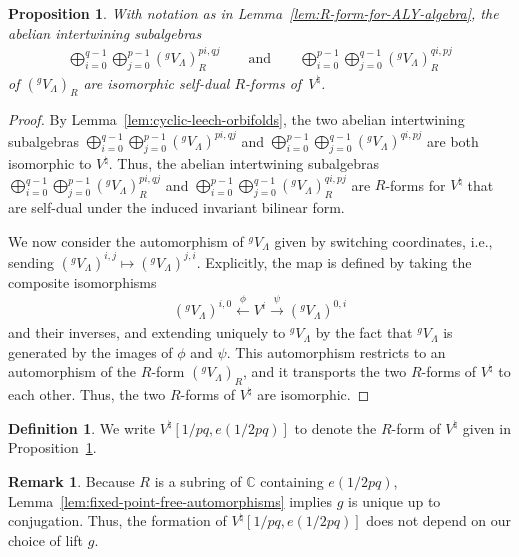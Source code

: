 \documentclass[11pt]{article}
\newcommand{\bC}{\mathbb{C}}
\newtheorem{prop}[thm]{Proposition}
\theoremstyle{definition}
\newtheorem{defn}[thm]{Definition}
\newtheorem{rem}[thm]{Remark}
\begin{document}
\begin{prop} \label{prop:R-forms-of-moonshine}
With notation as in Lemma~{\rm \ref{lem:R-form-for-ALY-algebra}}, the abelian intertwining subalgebras
\begin{gather*} \bigoplus_{i=0}^{q-1} \bigoplus_{j=0}^{p-1} ({}^gV_\Lambda)_R^{pi,qj} \qquad \text{and} \qquad \bigoplus_{i=0}^{p-1} \bigoplus_{j=0}^{q-1} ({}^gV_\Lambda)_R^{qi,pj}\end{gather*} of $({}^gV_\Lambda)_R$ are isomorphic self-dual $R$-forms of~$V^\natural$.
\end{prop}
\begin{proof}By Lemma~\ref{lem:cyclic-leech-orbifolds}, the two abelian intertwining subalgebras $\bigoplus_{i=0}^{q-1} \bigoplus_{j=0}^{p-1} ({}^gV_\Lambda)^{pi,qj}$ and $\bigoplus_{i=0}^{p-1} \bigoplus_{j=0}^{q-1} ({}^gV_\Lambda)^{qi,pj}$ are both isomorphic to $V^\natural$. Thus, the abelian intertwining subalgebras $\bigoplus_{i=0}^{q-1} \bigoplus_{j=0}^{p-1} ({}^gV_\Lambda)_R^{pi,qj}$ and $\bigoplus_{i=0}^{p-1} \bigoplus_{j=0}^{q-1} ({}^gV_\Lambda)_R^{qi,pj}$ are $R$-forms for $V^\natural$ that are self-dual under the induced invariant bilinear form.

We now consider the automorphism of ${}^gV_\Lambda$ given by switching coordinates, i.e., sending $({}^gV_\Lambda)^{i,j} \mapsto ({}^gV_\Lambda)^{j,i}$. Explicitly, the map is defined by taking the composite isomorphisms
\begin{gather*} ({}^gV_\Lambda)^{i,0} \overset{\phi}{\leftarrow} V^i \overset{\psi}{\to} ({}^gV_\Lambda)^{0,i} \end{gather*}
and their inverses, and extending uniquely to ${}^gV_\Lambda$ by the fact that ${}^gV_\Lambda$ is generated by the images of $\phi$ and $\psi$. This automorphism restricts to an automorphism of the $R$-form $({}^gV_\Lambda)_R$, and it transports the two $R$-forms of $V^\natural$ to each other. Thus, the two $R$-forms of $V^\natural$ are isomorphic.
\end{proof}

\begin{defn}We write $V^\natural[1/pq,e(1/2pq)]$ to denote the $R$-form of $V^\natural$ given in Proposi\-tion~\ref{prop:R-forms-of-moonshine}.
\end{defn}

\begin{rem}Because $R$ is a subring of $\bC$ containing $e(1/2pq)$, Lemma~\ref{lem:fixed-point-free-automorphisms} implies $g$ is unique up to conjugation. Thus, the formation of $V^\natural[1/pq,e(1/2pq)]$ does not depend on our choice of lift $g$.
\end{rem}
\end{document}

